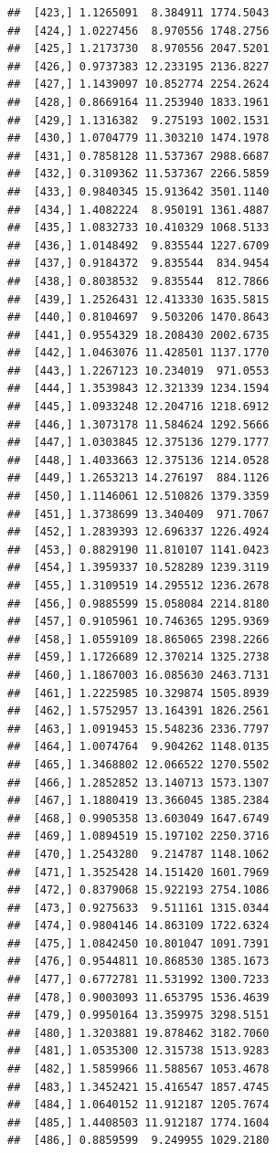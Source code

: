\documentclass[article]{jss}\usepackage[]{graphicx}\usepackage[]{xcolor}
\makeatletter
\newenvironment{kframe}{%
 \def\at@end@of@kframe{}%
 \ifinner\ifhmode%
  \def\at@end@of@kframe{\end{minipage}}%
  \begin{minipage}{\columnwidth}%
 \fi\fi%
 \def\FrameCommand##1{\hskip\@totalleftmargin \hskip-\fboxsep
 \colorbox{shadecolor}{##1}\hskip-\fboxsep
     \hskip-\linewidth \hskip-\@totalleftmargin \hskip\columnwidth}%
 \MakeFramed {\advance\hsize-\width
   \@totalleftmargin\z@ \linewidth\hsize
   \@setminipage}}%
 {\par\unskip\endMakeFramed%
 \at@end@of@kframe}
\newenvironment{knitrout}{}{} %
\makeatother
\begin{document}
\begin{knitrout}
\begin{kframe}
\begin{verbatim}
##  [423,] 1.1265091  8.384911 1774.5043
##  [424,] 1.0227456  8.970556 1748.2756
##  [425,] 1.2173730  8.970556 2047.5201
##  [426,] 0.9737383 12.233195 2136.8227
##  [427,] 1.1439097 10.852774 2254.2624
##  [428,] 0.8669164 11.253940 1833.1961
##  [429,] 1.1316382  9.275193 1002.1531
##  [430,] 1.0704779 11.303210 1474.1978
##  [431,] 0.7858128 11.537367 2988.6687
##  [432,] 0.3109362 11.537367 2266.5859
##  [433,] 0.9840345 15.913642 3501.1140
##  [434,] 1.4082224  8.950191 1361.4887
##  [435,] 1.0832733 10.410329 1068.5133
##  [436,] 1.0148492  9.835544 1227.6709
##  [437,] 0.9184372  9.835544  834.9454
##  [438,] 0.8038532  9.835544  812.7866
##  [439,] 1.2526431 12.413330 1635.5815
##  [440,] 0.8104697  9.503206 1470.8643
##  [441,] 0.9554329 18.208430 2002.6735
##  [442,] 1.0463076 11.428501 1137.1770
##  [443,] 1.2267123 10.234019  971.0553
##  [444,] 1.3539843 12.321339 1234.1594
##  [445,] 1.0933248 12.204716 1218.6912
##  [446,] 1.3073178 11.584624 1292.5666
##  [447,] 1.0303845 12.375136 1279.1777
##  [448,] 1.4033663 12.375136 1214.0528
##  [449,] 1.2653213 14.276197  884.1126
##  [450,] 1.1146061 12.510826 1379.3359
##  [451,] 1.3738699 13.340409  971.7067
##  [452,] 1.2839393 12.696337 1226.4924
##  [453,] 0.8829190 11.810107 1141.0423
##  [454,] 1.3959337 10.528289 1239.3119
##  [455,] 1.3109519 14.295512 1236.2678
##  [456,] 0.9885599 15.058084 2214.8180
##  [457,] 0.9105961 10.746365 1295.9369
##  [458,] 1.0559109 18.865065 2398.2266
##  [459,] 1.1726689 12.370214 1325.2738
##  [460,] 1.1867003 16.085630 2463.7131
##  [461,] 1.2225985 10.329874 1505.8939
##  [462,] 1.5752957 13.164391 1826.2561
##  [463,] 1.0919453 15.548236 2336.7797
##  [464,] 1.0074764  9.904262 1148.0135
##  [465,] 1.3468802 12.066522 1270.5502
##  [466,] 1.2852852 13.140713 1573.1307
##  [467,] 1.1880419 13.366045 1385.2384
##  [468,] 0.9905358 13.603049 1647.6749
##  [469,] 1.0894519 15.197102 2250.3716
##  [470,] 1.2543280  9.214787 1148.1062
##  [471,] 1.3525428 14.151420 1601.7969
##  [472,] 0.8379068 15.922193 2754.1086
##  [473,] 0.9275633  9.511161 1315.0344
##  [474,] 0.9804146 14.863109 1722.6324
##  [475,] 1.0842450 10.801047 1091.7391
##  [476,] 0.9544811 10.868530 1385.1673
##  [477,] 0.6772781 11.531992 1300.7233
##  [478,] 0.9003093 11.653795 1536.4639
##  [479,] 0.9950164 13.359975 3298.5151
##  [480,] 1.3203881 19.878462 3182.7060
##  [481,] 1.0535300 12.315738 1513.9283
##  [482,] 1.5859966 11.588567 1053.4678
##  [483,] 1.3452421 15.416547 1857.4745
##  [484,] 1.0640152 11.912187 1205.7674
##  [485,] 1.4408503 11.912187 1774.1604
##  [486,] 0.8859599  9.249955 1029.2180

\end{verbatim}
\end{kframe}
\end{knitrout}
\end{document}
